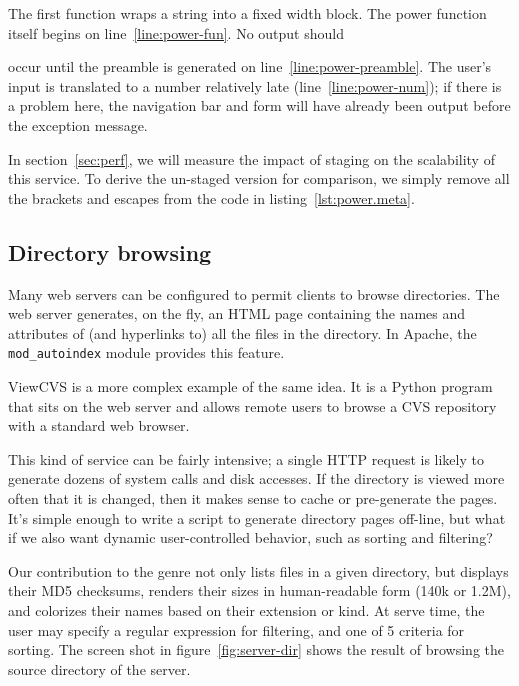 \documentclass[preprint]{acm_proc_article-sp}
\newcommand{\mylst}[3]{%
  }
\newcommand{\lstfile}{\mylst{}}
\begin{document}
\lstfile{power.meta}{This implements the staged power function as a
  web service.  The exponent \cd{y} is an early (publish stage)
  argument; but the base \cd{x} is late (serve stage).}

The first function wraps a string into a fixed width block.  The power
function itself begins on line~\ref{line:power-fun}.  No output should

occur until the preamble is generated on
line~\ref{line:power-preamble}.  The user's input is translated to a
number relatively late (line~\ref{line:power-num}); if there is a
problem here, the navigation bar and form will have already been
output before the exception message.

In section~\ref{sec:perf}, we will measure the impact of staging on
the scalability of this service.  To derive the un-staged version for
comparison, we simply remove all the brackets and escapes from the
code in listing~\ref{lst:power.meta}.

\subsection{Directory browsing}
\label{sec:eg:browse}

Many web servers can be configured to permit clients to browse
directories.  The web server generates, on the fly, an HTML page
containing the names and attributes of (and hyperlinks to) all
the files in the directory.  In Apache, the
\texttt{mod\_autoindex} module provides this feature.

ViewCVS is a more complex example of the same idea.  It is a
Python program that sits on the web server and allows remote
users to browse a CVS repository with a standard web browser.

This kind of service can be fairly intensive; a single HTTP
request is likely to generate dozens of system calls and disk
accesses.  If the directory is viewed more often that it is
changed, then it makes sense to cache or pre-generate the pages.
It's simple enough to write a script to generate directory pages
off-line, but what if we also want dynamic user-controlled
behavior, such as sorting and filtering?

Our contribution to the genre not only lists files in a given
directory, but displays their MD5 checksums, renders their sizes
in human-readable form (140k or 1.2M), and colorizes their names
based on their extension or kind.  At serve time, the user may
specify a regular expression for filtering, and one of 5
criteria for sorting.  The screen shot in
figure~\ref{fig:server-dir} shows the result of browsing the
source directory of the server.
\end{document}
